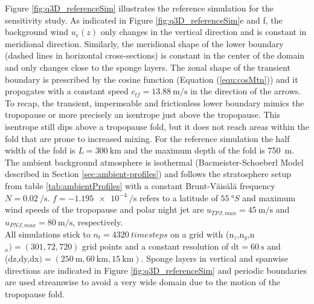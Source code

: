 Figure \ref{fig:q3D_referenceSim} illustrates the reference simulation for the sensitivity study. As indicated in Figure \ref{fig:q3D_referenceSim}e and f, the background wind $u_e(z)$ only changes in the vertical direction and is constant in meridional direction. Similarly, the meridional shape of the lower boundary (dashed lines in horizontal cross-sections) is constant in the center of the domain and only changes close to the sponge layers. The zonal shape of the transient boundary is prescribed by the cosine function (Equation (\ref{equ:cosMtn})) and it propagates with a constant speed $c_{tf}=\SI{13.88}{\meter\per\second}$ in the direction of the arrows. To recap, the transient, impermeable and frictionless lower boundary mimics the tropopause or more precisely an isentrope just above the tropopause. This isentrope still dips above a tropopause fold, but it does not reach areas within the fold that are prone to increased mixing. For the reference simulation the half width of the fold is $L = \SI{300}{\kilo\meter}$ and the maximum depth of the fold is \SI{750}{\meter}. \\
The ambient background atmosphere is isothermal (Bacmeister-Schoeberl Model described in Section \ref{sec:ambient-profiles}) and follows the stratosphere setup from table \ref{tab:ambientProfiles} with a constant Brunt-Väisälä frequency $N=\SI{0.02}{\per\second}$. $f = \SI{-1.195e-4}{\per\second}$ refers to a latitude of $\SI{55}{\degree S}$ and maximum wind speeds of the tropopause and polar night jet are $u_{TPJ,max}=\SI{45}{\meter\per\second}$ and $u_{PNJ,max}=\SI{80}{\meter\per\second}$, respectively. \\
All simulations stick to $n_t=\SI{4320}{time steps}$ on a grid with (n$_z$,n$_y$,n$_x)=(301,72,720)$ grid points and a constant resolution of $\mathrm{dt}=\SI{60}{\second}$ and (dz,dy,dx$)=(\SI{250}{\meter},\SI{60}{\kilo\meter},\SI{15}{\kilo\meter})$. Sponge layers in vertical and spanwise directions are indicated in Figure \ref{fig:q3D_referenceSim} and periodic boundaries are used streamwise to avoid a very wide domain due to the motion of the tropopause fold.
%
%
